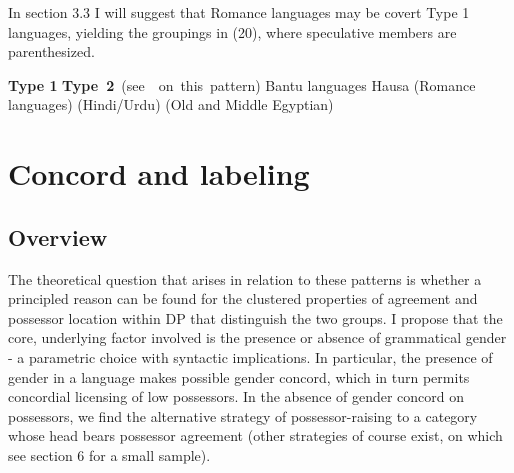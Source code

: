 \documentclass[output=paper
,modfonts
,nonflat]{langsci/langscibook}
\begin{document}
\begin{figure}[!h]
	\begin{exe}
	\end{exe}
\end{figure}
\noindent In section 3.3 I will suggest that Romance languages may be covert Type 1 languages, yielding the groupings in (20), where speculative members are parenthesized.

\begin{exe}
	\ex
\hspace{-0.05cm}\textbf{Type 1}  \mbox{\hspace{5.4cm}\textbf{Type 2} (see \citealt{Abney1987} on this pattern)}
Bantu languages  
Hausa  
(Romance languages)  
(Hindi/Urdu)  
(Old and Middle Egyptian)        
\end{exe}

\section{Concord and labeling} 
\subsection{Overview}
The theoretical question that arises in relation to these patterns is whether a principled reason can be found for the clustered properties of agreement and possessor location within DP that distinguish the two groups. I propose that the core, underlying factor involved is the presence or absence of grammatical gender - a parametric choice with syntactic implications. In particular, the presence of gender in a language makes possible gender concord, which in turn permits concordial licensing of low possessors. In the absence of gender concord on possessors, we find the alternative strategy of possessor-raising to a category whose head bears possessor agreement (other strategies of course exist, on which see section 6 for a small sample). 
\end{document}
